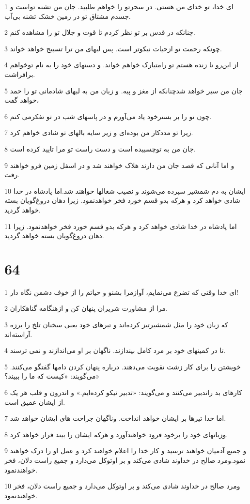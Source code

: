 \par 1 ای خدا، تو خدای من هستی. در سحرتو را خواهم طلبید. جان من تشنه تواست و جسدم مشتاق تو در زمین خشک تشنه بی‌آب.
\par 2 چنانکه در قدس بر تو نظر کردم تا قوت و جلال تو را مشاهده کنم.
\par 3 چونکه رحمت تو ازحیات نیکوتر است. پس لبهای من ترا تسبیح خواهد خواند.
\par 4 از این‌رو تا زنده هستم تو رامتبارک خواهم خواند. و دستهای خود را به نام توخواهم برافراشت.
\par 5 جان من سیر خواهد شدچنانکه از مغز و پیه. و زبان من به لبهای شادمانی تو را حمد خواهد گفت،
\par 6 چون تو را بر بسترخود یاد می‌آورم و در پاسهای شب در تو تفکرمی کنم.
\par 7 زیرا تو مددکار من بوده‌ای و زیر سایه بالهای تو شادی خواهم کرد.
\par 8 جان من به توچسبیده است و دست راست تو مرا تایید کرده است.
\par 9 و اما آنانی که قصد جان من دارند هلاک خواهند شد و در اسفل زمین فرو خواهند رفت.
\par 10 ایشان به دم شمشیر سپرده می‌شوند و نصیب شغالها خواهند شد.اما پادشاه در خدا شادی خواهد کرد و هر‌که بدو قسم خورد فخر خواهدنمود. زیرا دهان دروغ‌گویان بسته خواهد گردید.
\par 11 اما پادشاه در خدا شادی خواهد کرد و هر‌که بدو قسم خورد فخر خواهدنمود. زیرا دهان دروغ‌گویان بسته خواهد گردید.
 
\chapter{64}

\par 1 ای خدا وقتی که تضرع می‌نمایم، آوازمرا بشنو و حیاتم را از خوف دشمن نگاه دار!
\par 2 مرا از مشاورت شریران پنهان کن و ازهنگامه گناهکاران.
\par 3 که زبان خود را مثل شمشیرتیز کرده‌اند و تیرهای خود یعنی سخنان تلخ را برزه آراسته‌اند.
\par 4 تا در کمینهای خود بر مرد کامل بیندازند. ناگهان بر او می‌اندازند و نمی ترسند.
\par 5 خویشتن را برای کار زشت تقویت می‌دهند. درباره پنهان کردن دامها گفتگو می‌کنند. می‌گویند: «کیست که ما را ببیند؟»
\par 6 کارهای بد راتدبیر می‌کنند و می‌گویند: «تدبیر نیکو کرده‌ایم.» و اندرون و قلب هر یک از ایشان عمیق است.
\par 7 اما خدا تیرها بر ایشان خواهد انداخت. وناگهان جراحت های ایشان خواهد شد.
\par 8 وزبانهای خود را برخود فرود خواهند‌آورد و هرکه ایشان را بیند فرار خواهد کرد.
\par 9 و جمیع آدمیان خواهند ترسید و کار خدا را اعلام خواهند کرد و عمل او را درک خواهند نمود.ومرد صالح در خداوند شادی می‌کند و بر اوتوکل می‌دارد و جمیع راست دلان، فخر خواهندنمود.
\par 10 ومرد صالح در خداوند شادی می‌کند و بر اوتوکل می‌دارد و جمیع راست دلان، فخر خواهندنمود.
 
